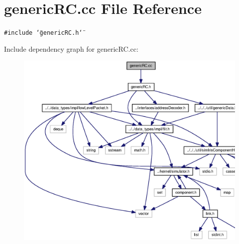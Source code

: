 \section{genericRC.cc File Reference}
\label{genericRC_8cc}
{\tt \#include \char`\"{}genericRC.h\char`\"{}}\par


Include dependency graph for genericRC.cc:\nopagebreak
\begin{figure}[H]
\begin{center}
\leavevmode
\includegraphics[width=357pt]{genericRC_8cc__incl}
\end{center}
\end{figure}
